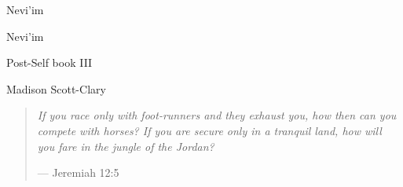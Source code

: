 \documentclass[11pt]{memoir}
\begin{document}
  \frontmatter

  \thispagestyle{empty}
  \null
  \vfill
  \begin{flushright}
    \DisplayFont Nevi'im
  \end{flushright}
  \vfill
  \cleardoublepage

  \pagestyle{plain}

  \doublespacing

  \begin{flushright}
    \null
    \vfill
    {\Huge\DisplayFont Nevi'im}

    {\DisplayFont Post-Self book III}

    \vfill

    {\Large\DisplayFont Madison Scott-Clary}
  \end{flushright}
  \thispagestyle{empty}

  \newpage

  

  \newpage
  \null
  \cleardoublepage



  \mainmatter

  \pagestyle{ourbook}

  \cleardoublepage
  \null
  \thispagestyle{empty}
  \vfill
  \begin{quote}
    \small
    \emph{If you race only with foot-runners and they exhaust you, how then can you compete with horses? If you are secure only in a tranquil land, how will you fare in the jungle of the Jordan?}

    --- Jeremiah 12:5
  \end{quote}
  \vfill

  
  
  
  
  
  
  
  
  
  
  
  
  
  

  
  
  
  
  
  
  
  
  
  
  
  
  
  
  
  
  
\end{document}
